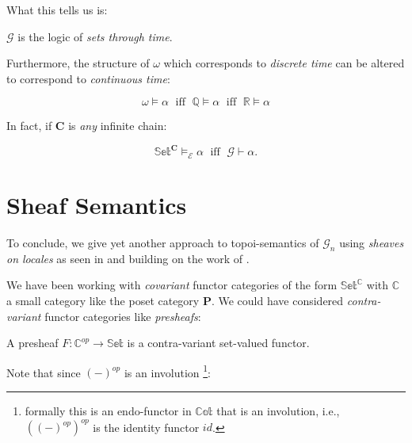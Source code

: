 What this tells us is:

\begin{prop}
	$\mathcal{G}$ is the logic of \emph{sets through time}.
\end{prop}

Furthermore, the structure of $\omega$ which corresponds to \emph{discrete time} can be altered to correspond to \emph{continuous time}:

\begin{prop}
	\begin{equation*}
		\omega \models \alpha \; \text{ iff } \; \mathbb{Q} \models \alpha \; \text{ iff } \; \mathbb{R} \models \alpha  
	\end{equation*}	 
\end{prop}
 
 In fact, if \textbf{C} is \emph{any} infinite chain: 
 
 \begin{prop}
 	\begin{equation*}
 		\mathbb{Set}^{\textbf{C}} \models_{\mathcal{E}} \alpha \; \text{ iff } \; \mathcal{G} \vdash \alpha. 
 	\end{equation*}
 \end{prop}
 


\newpage
\section{Sheaf Semantics} 
To conclude, we give yet another approach to topoi-semantics of $\mathcal{G}_n$ using \emph{sheaves on locales} as seen in \cite{borceaux} and building on the work of  \cite{lisboa}.\newline
 
We have been working with \emph{covariant} functor categories of the form $\mathbb{Set}^\mathbb{C}$ with $\mathbb{C}$ a small category like the poset category $\textbf{P}$. \newline
We could have considered \emph{contra-variant} functor categories like \emph{presheafs}:

\begin{definition}[presheaf]
	A presheaf $F: \mathbb{C}^{op} \rightarrow \mathbb{Set}$ is a contra-variant set-valued functor.
\end{definition} 

Note that since $(-)^{op}$ is an involution \footnote{formally this is an endo-functor in $\mathbb{Cat}$ that is an involution, i.e., $((-)^{op})^{op}$ is the identity functor $id$.}:

